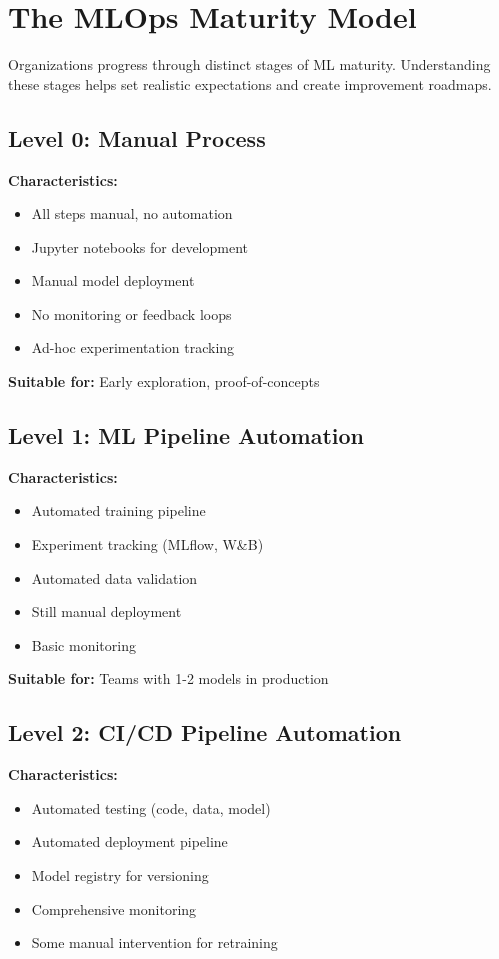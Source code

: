 \section{The MLOps Maturity Model}

Organizations progress through distinct stages of ML maturity. Understanding these stages helps set realistic expectations and create improvement roadmaps.

\subsection{Level 0: Manual Process}

\textbf{Characteristics:}
\begin{itemize}
    \item All steps manual, no automation
    \item Jupyter notebooks for development
    \item Manual model deployment
    \item No monitoring or feedback loops
    \item Ad-hoc experimentation tracking
\end{itemize}

\textbf{Suitable for:} Early exploration, proof-of-concepts

\subsection{Level 1: ML Pipeline Automation}

\textbf{Characteristics:}
\begin{itemize}
    \item Automated training pipeline
    \item Experiment tracking (MLflow, W\&B)
    \item Automated data validation
    \item Still manual deployment
    \item Basic monitoring
\end{itemize}

\textbf{Suitable for:} Teams with 1-2 models in production

\subsection{Level 2: CI/CD Pipeline Automation}

\textbf{Characteristics:}
\begin{itemize}
    \item Automated testing (code, data, model)
    \item Automated deployment pipeline
    \item Model registry for versioning
    \item Comprehensive monitoring
    \item Some manual intervention for retraining
\end{itemize}

